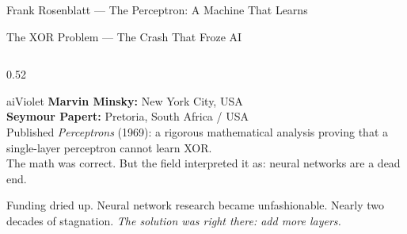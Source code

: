 \begin{frame}[shrink=9]{Frank Rosenblatt --- The Perceptron: A Machine That Learns}
\end{frame}

\begin{frame}[shrink=20]{The XOR Problem --- The Crash That Froze AI}

  \begin{columns}[T]
    \begin{column}{0.52\textwidth}
      \begin{personbox}{aiViolet}
        \textbf{Marvin Minsky:} New York City, USA\\
        \textbf{Seymour Papert:} Pretoria, South Africa / USA\\[3pt]
        Published \emph{Perceptrons} (1969): a rigorous mathematical
        analysis proving that a single-layer perceptron
        \alert{cannot learn XOR}.\\[3pt]
        The math was correct. But the field interpreted it as:
        neural networks are a dead end.
      \end{personbox}

      \vspace{0.3em}
      \begin{tcolorbox}[colback=red!5,colframe=red!70,
        fonttitle=\bfseries\small,title={The AI Winter (\raisebox{0pt}{\small$\sim$}1969--1986)},
        rounded corners,boxrule=0.8pt,left=3pt,right=3pt,top=3pt,bottom=3pt]
        \small Funding dried up. Neural network research became
        unfashionable. Nearly two decades of stagnation.
        \emph{The solution was right there: add more layers.}
      \end{tcolorbox}
    \end{column}


\end{columns}
\end{frame}
